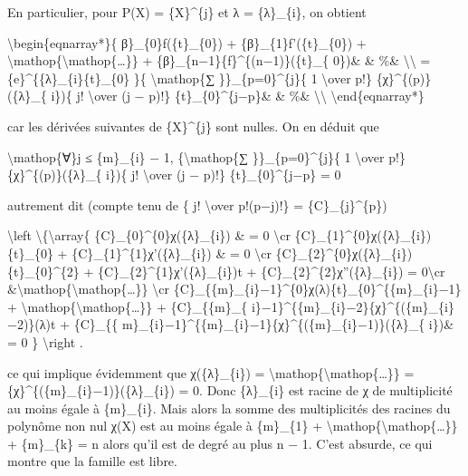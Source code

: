 \documentclass[]{article}
\begin{document}
En particulier, pour P(X) = \{X\}\^{}\{j\} et λ = \{λ\}\_\{i\}, on
obtient

\textbackslash{}begin\{eqnarray*\}\{ β\}\_\{0\}f(\{t\}\_\{0\}) +
\{β\}\_\{1\}f'(\{t\}\_\{0\}) +
\textbackslash{}mathop\{\textbackslash{}mathop\{\ldots{}\}\} +
\{β\}\_\{n−1\}\{f\}\^{}\{(n−1)\}(\{t\}\_\{ 0\})\& \& \%\&
\textbackslash{}\textbackslash{} = \{e\}\^{}\{\{λ\}\_\{i\}\{t\}\_\{0\}
\}\{ \textbackslash{}mathop\{∑ \}\}\_\{p=0\}\^{}\{j\}\{ 1
\textbackslash{}over p!\} \{χ\}\^{}\{(p)\}(\{λ\}\_\{ i\})\{ j!
\textbackslash{}over (j − p)!\} \{t\}\_\{0\}\^{}\{j−p\}\& \& \%\&
\textbackslash{}\textbackslash{} \textbackslash{}end\{eqnarray*\}

car les dérivées suivantes de \{X\}\^{}\{j\} sont nulles. On en déduit
que

\textbackslash{}mathop\{∀\}j ≤ \{m\}\_\{i\} − 1,
\{\textbackslash{}mathop\{∑ \}\}\_\{p=0\}\^{}\{j\}\{ 1
\textbackslash{}over p!\} \{χ\}\^{}\{(p)\}(\{λ\}\_\{ i\})\{ j!
\textbackslash{}over (j − p)!\} \{t\}\_\{0\}\^{}\{j−p\} = 0

autrement dit (compte tenu de \{ j! \textbackslash{}over p!(p−j)!\} =
\{C\}\_\{j\}\^{}\{p\})

\textbackslash{}left \textbackslash{}\{\textbackslash{}array\{
\{C\}\_\{0\}\^{}\{0\}χ(\{λ\}\_\{i\}) \& = 0 \textbackslash{}cr
\{C\}\_\{1\}\^{}\{0\}χ(\{λ\}\_\{i\})\{t\}\_\{0\} +
\{C\}\_\{1\}\^{}\{1\}χ'(\{λ\}\_\{i\}) \& = 0 \textbackslash{}cr
\{C\}\_\{2\}\^{}\{0\}χ(\{λ\}\_\{i\})\{t\}\_\{0\}\^{}\{2\} +
\{C\}\_\{2\}\^{}\{1\}χ'(\{λ\}\_\{i\})t +
\{C\}\_\{2\}\^{}\{2\}χ''(\{λ\}\_\{i\}) = 0\textbackslash{}cr
\&\textbackslash{}mathop\{\textbackslash{}mathop\{\ldots{}\}\}
\textbackslash{}cr
\{C\}\_\{\{m\}\_\{i\}−1\}\^{}\{0\}χ(λ)\{t\}\_\{0\}\^{}\{\{m\}\_\{i\}−1\}
+ \textbackslash{}mathop\{\textbackslash{}mathop\{\ldots{}\}\} +
\{C\}\_\{\{m\}\_\{
i\}−1\}\^{}\{\{m\}\_\{i\}−2\}\{χ\}\^{}\{(\{m\}\_\{i\}−2)\}(λ)t +
\{C\}\_\{\{
m\}\_\{i\}−1\}\^{}\{\{m\}\_\{i\}−1\}\{χ\}\^{}\{(\{m\}\_\{i\}−1)\}(\{λ\}\_\{
i\})\& = 0 \} \textbackslash{}right .

ce qui implique évidemment que χ(\{λ\}\_\{i\}) =
\textbackslash{}mathop\{\textbackslash{}mathop\{\ldots{}\}\} =
\{χ\}\^{}\{(\{m\}\_\{i\}−1)\}(\{λ\}\_\{i\}) = 0. Donc \{λ\}\_\{i\} est
racine de χ de multiplicité au moins égale à \{m\}\_\{i\}. Mais alors la
somme des multiplicités des racines du polynôme non nul χ(X) est au
moins égale à \{m\}\_\{1\} +
\textbackslash{}mathop\{\textbackslash{}mathop\{\ldots{}\}\} +
\{m\}\_\{k\} = n alors qu'il est de degré au plus n − 1. C'est absurde,
ce qui montre que la famille est libre.
\end{document}
